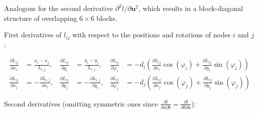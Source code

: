 Analogous for the second derivative $\partial^2 l/\partial \boldsymbol{u}^2$, which results in a block-diagonal structure of overlapping $6 \times 6$ blocks.

First derivatives of $l_{ij}$ with respect to the positions and rotations of nodes $i$ and $j$:


\begin{align}
\frac{\partial L_{ij}}{\partial x_i} &= \frac{x_i - x_j}{L_{i,j}} , & \frac{\partial L_{ij}}{\partial y_i} &= \frac{y_i - y_j}{L_{i,j}}, & \frac{\partial L_{ij}}{\partial \varphi_i} &= -d_{i}\left(\frac{\partial L_{ij}}{\partial x_i}\cos(\varphi_i) + \frac{\partial L_{ij}}{\partial y_i}\sin(\varphi_i)\right) \\
\frac{\partial L_{ij}}{\partial x_j} &= -\frac{\partial L_{i,j}}{\partial x_i}, & \frac{\partial L_{ij}}{\partial y_j} &= -\frac{\partial L_{i,j}}{\partial y_i}, & \frac{\partial L_{ij}}{\partial \varphi_j} &= -d_{j}\left(\frac{\partial L_{ij}}{\partial x_j}\cos(\varphi_j) + \frac{\partial L_{ij}}{\partial y_j}\sin(\varphi_j)\right)
\end{align}

Second derivatives (omitting symmetric ones since $\frac{\partial l}{\partial a \partial b} = \frac{\partial l}{\partial b \partial a}$):


